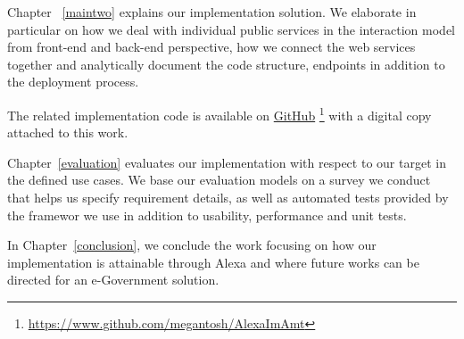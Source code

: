 Chapter ~\ref{maintwo} 
explains our implementation solution. We elaborate in particular on how we deal with individual public services in the interaction model from front-end and back-end perspective, how we connect the web services together and analytically document the code structure, endpoints in addition to the deployment process.

The related implementation code is available on \href{https://www.github.com/megantosh/AlexaImAmt}{GitHub} \footnote{\url{https://www.github.com/megantosh/AlexaImAmt} } with a digital copy attached to this work. 

Chapter~\ref{evaluation} evaluates our implementation with respect to our target in the defined %
use cases. We base our evaluation models on a survey we conduct that helps us specify requirement details, as well as automated tests provided by the framewor we use in addition to usability, performance and unit tests. 

In Chapter~\ref{conclusion}, we conclude the work focusing on how our implementation %
is attainable through Alexa and where future works can be directed for an e-Government solution.
